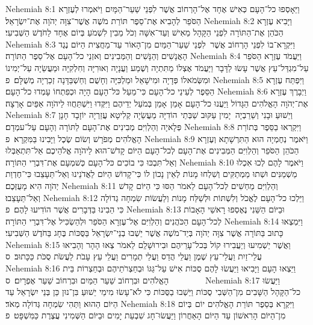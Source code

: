 Nehemiah 8:1	וַיֵּאָסְפוּ כל־הָעָם כְּאִישׁ אֶחָד אֶל־הָרְחוֹב אֲשֶׁר לִפְנֵי שַׁעַר־הַמָּיִם וַיֹּאמְרוּ לְעֶזְרָא הַסֹּפֵר לְהָבִיא אֶת־סֵפֶר תּוֹרַת מֹשֶׁה אֲשֶׁר־צִוָּה יְהֹוָה אֶת־יִשְׂרָאֵל׃
Nehemiah 8:2	וַיָּבִיא עֶזְרָא הַכֹּהֵן אֶת־הַתּוֹרָה לִפְנֵי הַקָּהָל מֵאִישׁ וְעַד־אִשָּׁה וְכֹל מֵבִין לִשְׁמֹעַ בְּיוֹם אֶחָד לַחֹדֶשׁ הַשְּׁבִיעִי׃
Nehemiah 8:3	וַיִּקְרָא־בוֹ לִפְנֵי הָרְחוֹב אֲשֶׁר  לִפְנֵי שַׁעַר־הַמַּיִם מִן־הָאוֹר עַד־מַחֲצִית הַיּוֹם נֶגֶד הָאֲנָשִׁים וְהַנָּשִׁים וְהַמְּבִינִים וְאזְנֵי כל־הָעָם אֶל־סֵפֶר הַתּוֹרָה׃
Nehemiah 8:4	וַיַּעֲמֹד עֶזְרָא הַסֹּפֵר עַל־מִגְדַּל־עֵץ אֲשֶׁר עָשׂוּ לַדָּבָר וַיַּעֲמֹד אֶצְלוֹ מַתִּתְיָה וְשֶׁמַע וַעֲנָיָה וְאוּרִיָּה וְחִלְקִיָּה וּמַעֲשֵׂיָה עַל־יְמִינוֹ וּמִשְּׂמֹאלוֹ פְּדָיָה וּמִישָׁאֵל וּמַלְכִּיָּה וְחָשֻׁם וְחַשְׁבַּדָּנָה זְכַרְיָה מְשֻׁלָּם׃ {פ}
Nehemiah 8:5	וַיִּפְתַּח עֶזְרָא הַסֵּפֶר לְעֵינֵי כל־הָעָם כִּי־מֵעַל כּל־הָעָם הָיָה וּכְפִתְחוֹ עָמְדוּ כל־הָעָם׃
Nehemiah 8:6	וַיְבָרֶךְ עֶזְרָא אֶת־יְהֹוָה הָאֱלֹהִים הַגָּדוֹל וַיַּעֲנוּ כל־הָעָם אָמֵן  אָמֵן בְּמֹעַל יְדֵיהֶם וַיִּקְּדוּ וַיִּשְׁתַּחֲווּ לַיהֹוָה אַפַּיִם אָרְצָה׃
Nehemiah 8:7	וְיֵשׁוּעַ וּבָנִי וְשֵׁרֵבְיָה  יָמִין עַקּוּב שַׁבְּתַי  הוֹדִיָּה מַעֲשֵׂיָה קְלִיטָא עֲזַרְיָה יוֹזָבָד חָנָן פְּלָאיָה וְהַלְוִיִּם מְבִינִים אֶת־הָעָם לַתּוֹרָה וְהָעָם עַל־עמְדָם׃
Nehemiah 8:8	וַיִּקְרְאוּ בַסֵּפֶר בְּתוֹרַת הָאֱלֹהִים מְפֹרָשׁ וְשׂוֹם שֶׂכֶל וַיָּבִינוּ בַּמִּקְרָא׃ {פ}
Nehemiah 8:9	וַיֹּאמֶר נְחֶמְיָה הוּא הַתִּרְשָׁתָא וְעֶזְרָא הַכֹּהֵן  הַסֹּפֵר וְהַלְוִיִּם הַמְּבִינִים אֶת־הָעָם לְכל־הָעָם הַיּוֹם קָדֹשׁ־הוּא לַיהֹוָה אֱלֹהֵיכֶם אַל־תִּתְאַבְּלוּ וְאַל־תִּבְכּוּ כִּי בוֹכִים כּל־הָעָם כְּשׁמְעָם אֶת־דִּבְרֵי הַתּוֹרָה׃
Nehemiah 8:10	וַיֹּאמֶר לָהֶם לְכוּ אִכְלוּ מַשְׁמַנִּים וּשְׁתוּ מַמְתַקִּים וְשִׁלְחוּ מָנוֹת לְאֵין נָכוֹן לוֹ כִּי־קָדוֹשׁ הַיּוֹם לַאֲדֹנֵינוּ וְאַל־תֵּעָצֵבוּ כִּי־חֶדְוַת יְהֹוָה הִיא מָעֻזְּכֶם׃
Nehemiah 8:11	וְהַלְוִיִּם מַחְשִׁים לְכל־הָעָם לֵאמֹר הַסּוּ כִּי הַיּוֹם קָדֹשׁ וְאַל־תֵּעָצֵבוּ׃
Nehemiah 8:12	וַיֵּלְכוּ כל־הָעָם לֶאֱכֹל וְלִשְׁתּוֹת וּלְשַׁלַּח מָנוֹת וְלַעֲשׂוֹת שִׂמְחָה גְדוֹלָה כִּי הֵבִינוּ בַּדְּבָרִים אֲשֶׁר הוֹדִיעוּ לָהֶם׃ {פ}
Nehemiah 8:13	וּבַיּוֹם הַשֵּׁנִי נֶאֶסְפוּ רָאשֵׁי הָאָבוֹת לְכל־הָעָם הַכֹּהֲנִים וְהַלְוִיִּם אֶל־עֶזְרָא הַסֹּפֵר וּלְהַשְׂכִּיל אֶל־דִּבְרֵי הַתּוֹרָה׃
Nehemiah 8:14	וַיִּמְצְאוּ כָּתוּב בַּתּוֹרָה אֲשֶׁר צִוָּה יְהֹוָה בְּיַד־מֹשֶׁה אֲשֶׁר יֵשְׁבוּ בְנֵי־יִשְׂרָאֵל בַּסֻּכּוֹת בֶּחָג בַּחֹדֶשׁ הַשְּׁבִיעִי׃
Nehemiah 8:15	וַאֲשֶׁר יַשְׁמִיעוּ וְיַעֲבִירוּ קוֹל בְּכל־עָרֵיהֶם וּבִירוּשָׁלַ͏ִם לֵאמֹר צְאוּ הָהָר וְהָבִיאוּ עֲלֵי־זַיִת וַעֲלֵי־עֵץ שֶׁמֶן וַעֲלֵי הֲדַס וַעֲלֵי תְמָרִים וַעֲלֵי עֵץ עָבֹת לַעֲשֹׂת סֻכֹּת כַּכָּתוּב׃ {ס}        
Nehemiah 8:16	וַיֵּצְאוּ הָעָם וַיָּבִיאוּ וַיַּעֲשׂוּ לָהֶם סֻכּוֹת אִישׁ עַל־גַּגּוֹ וּבְחַצְרֹתֵיהֶם וּבְחַצְרוֹת בֵּית הָאֱלֹהִים וּבִרְחוֹב שַׁעַר הַמַּיִם וּבִרְחוֹב שַׁעַר אֶפְרָיִם׃ {ס}        
Nehemiah 8:17	וַיַּעֲשׂוּ כל־הַקָּהָל הַשָּׁבִים מִן־הַשְּׁבִי  סֻכּוֹת וַיֵּשְׁבוּ בַסֻּכּוֹת כִּי לֹא־עָשׂוּ מִימֵי יֵשׁוּעַ בִּן־נוּן כֵּן בְּנֵי יִשְׂרָאֵל עַד הַיּוֹם הַהוּא וַתְּהִי שִׂמְחָה גְּדוֹלָה מְאֹד׃
Nehemiah 8:18	וַיִּקְרָא בְּסֵפֶר תּוֹרַת הָאֱלֹהִים יוֹם  בְּיוֹם מִן־הַיּוֹם הָרִאשׁוֹן עַד הַיּוֹם הָאַחֲרוֹן וַיַּעֲשׂוּ־חָג שִׁבְעַת יָמִים וּבַיּוֹם הַשְּׁמִינִי עֲצֶרֶת כַּמִּשְׁפָּט׃ {פ}
